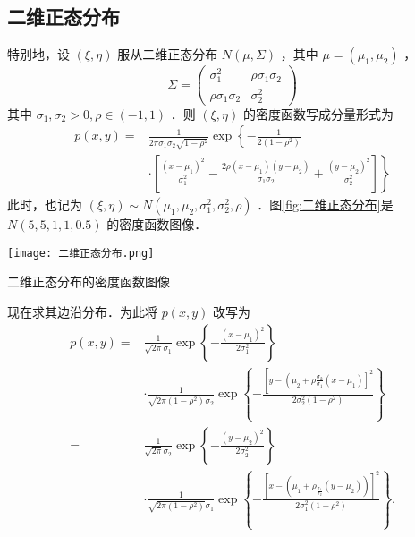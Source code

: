 \subsection{二维正态分布}
特别地，设 $(\xi, \eta)$ 服从二维正态分布 $N(\mu, \Sigma)$ ，其中 $\mu=\left(\mu_1, \mu_2\right)$ ，
$$
    \Sigma=\left(\begin{array}{cc}
            \sigma_1^2             & \rho \sigma_1 \sigma_2 \\
            \rho \sigma_1 \sigma_2 & \sigma_2^2
        \end{array}\right)
$$
其中 $\sigma_1, \sigma_2>0, \rho \in(-1,1)$ ．则 $(\xi, \eta)$ 的密度函数写成分量形式为
$$
    \begin{aligned}
        p(x, y)= & \frac{1}{2 \pi \sigma_1 \sigma_2 \sqrt{1-\rho^2}} \exp \left\{-\frac{1}{2\left(1-\rho^2\right)}\right.                                                                                       \\
                 & \left.\cdot\left[\frac{\left(x-\mu_1\right)^2}{\sigma_1^2}-\frac{2 \rho\left(x-\mu_1\right)\left(y-\mu_2\right)}{\sigma_1 \sigma_2}+\frac{\left(y-\mu_2\right)^2}{\sigma_2^2}\right]\right\}
    \end{aligned}
$$
此时，也记为 $(\xi, \eta) \sim N\left(\mu_1, \mu_2, \sigma_1^2, \sigma_2^2, \rho\right)$ ．图\ref{fig:二维正态分布}是 $N(5,5,1,1,0.5)$ 的密度函数图像．
\begin{marginfigure}
    \centering
    \texttt{[image: 二维正态分布.png]}
    \caption{二维正态分布的密度函数图像}
    \label{fig:二维正态分布}
\end{marginfigure}
现在求其边沿分布．为此将 $p(x, y)$ 改写为
$$
    \begin{aligned}
        p(x, y)= & \frac{1}{\sqrt{2 \pi} \sigma_1} \exp \left\{-\frac{\left(x-\mu_1\right)^2}{2 \sigma_1^2}\right\}                                                                                                                     \\
                 & \cdot \frac{1}{\sqrt{2 \pi\left(1-\rho^2\right)} \sigma_2} \exp \left\{-\frac{\left[y-\left(\mu_2+\rho \frac{\sigma_2}{\sigma_1}\left(x-\mu_1\right)\right]^2\right.}{2 \sigma_2^2\left(1-\rho^2\right)}\right\}     \\
        =        & \frac{1}{\sqrt{2 \pi} \sigma_2} \exp \left\{-\frac{\left(y-\mu_2\right)^2}{2 \sigma_2^2}\right\}                                                                                                                     \\
                 & \cdot \frac{1}{\sqrt{2 \pi\left(1-\rho^2\right)} \sigma_1} \exp \left\{-\frac{\left[x-\left(\mu_1+\rho_{\frac{\sigma_1}{\sigma_2}}\left(y-\mu_2\right)\right)\right]^2}{2 \sigma_1^2\left(1-\rho^2\right)}\right\} .
    \end{aligned}
$$
